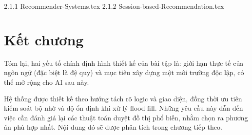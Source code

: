 \label{...}

{2.1.1 Recommender-Systems.tex}
{2.1.2 Session-based-Recommendation.tex}








\section{Kết chương}

Tóm lại, hai yếu tố chính định hình thiết kế của bài tập là: giới hạn thực tế của ngôn ngữ (đặc biệt là đệ quy) và mục tiêu xây dựng một môi trường độc lập, có thể mở rộng cho AI sau này.

Hệ thống được thiết kế theo hướng tách rõ logic và giao diện, đồng thời ưu tiên kiểm soát bộ nhớ và độ ổn định khi xử lý flood fill. Những yêu cầu này dẫn đến việc cần đánh giá lại các thuật toán duyệt đồ thị phổ biến, nhằm chọn ra phương án phù hợp nhất. Nội dung đó sẽ được phân tích trong chương tiếp theo.